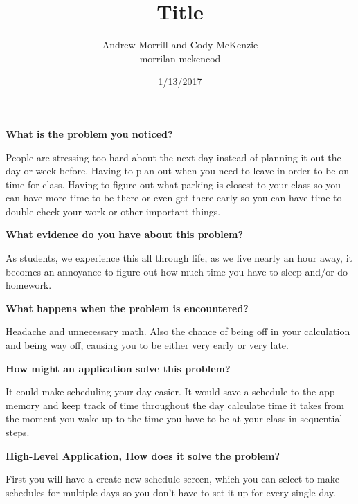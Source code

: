 \documentclass[12pt]{article}
\title{Title}
\author{Andrew Morrill and Cody McKenzie \\ { morrilan \qquad \quad mckencod}}
\date{1/13/2017}
\begin{document}
\maketitle
	
	\begin{flushleft}
		\textbf{What is the problem you noticed?}
	\end{flushleft}

	People are stressing too hard about the next day instead of planning it out the day or week before.  Having to plan out when you need to leave in order to be on time for class.   Having to figure out what parking is closest to your class so you can have more time to be there or even get there early so you can have time to double check your work or other important things.\\
	
		
	\begin{flushleft}
		\textbf{What evidence do you have about this problem?}
	\end{flushleft}

	As students, we experience this all through life, as we live nearly an hour away, it becomes an annoyance to figure out how much time you have to sleep and/or do homework. \\
	
	
	\begin{flushleft}
		\textbf{What happens when the problem is encountered?}
	\end{flushleft}

	Headache and unnecessary math. Also the chance of being off in your calculation and being way off, causing you to be either very early or very late. \\
	
	
	\begin{flushleft}
		\textbf{How might an application solve this problem?}
	\end{flushleft}

	It could make scheduling your day easier.  It would save a schedule to the app memory and keep track of time throughout the day calculate time it takes from the moment you wake up to the time you have to be at your class in sequential steps. \\
	
	
	\begin{flushleft}
		\textbf{High-Level Application, How does it solve the problem?}
	\end{flushleft}

	First you will have a create new schedule screen, which you can select to make schedules for multiple days so you don’t have to set it up for every single day.
	
\end{document}
